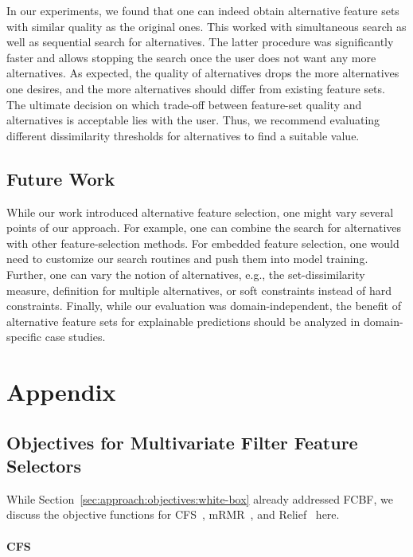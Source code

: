 \documentclass{article}
\theoremstyle{definition}
\begin{document}
In our experiments, we found that one can indeed obtain alternative feature sets with similar quality as the original ones.
This worked with simultaneous search as well as sequential search for alternatives.
The latter procedure was significantly faster and allows stopping the search once the user does not want any more alternatives.
As expected, the quality of alternatives drops the more alternatives one desires, and the more alternatives should differ from existing feature sets.
The ultimate decision on which trade-off between feature-set quality and alternatives is acceptable lies with the user.
Thus, we recommend evaluating different dissimilarity thresholds for alternatives to find a suitable value.

\subsection{Future Work}

While our work introduced alternative feature selection, one might vary several points of our approach.
For example, one can combine the search for alternatives with other feature-selection methods.
For embedded feature selection, one would need to customize our search routines and push them into model training.
Further, one can vary the notion of alternatives, e.g., the set-dissimilarity measure, definition for multiple alternatives, or soft constraints instead of hard constraints.
Finally, while our evaluation was domain-independent, the benefit of alternative feature sets for explainable predictions should be analyzed in domain-specific case studies.

\appendix

\section{Appendix}
\label{sec:appendix}

\subsection{Objectives for Multivariate Filter Feature Selectors}
\label{sec:appendix:multivariate-filter-objectives}

While Section~\ref{sec:approach:objectives:white-box} already addressed FCBF, we discuss the objective functions for CFS~\cite{hall1999correlation}, mRMR~\cite{peng2005feature}, and Relief~\cite{kira1992feature} here.

\paragraph{CFS}
\end{document}
